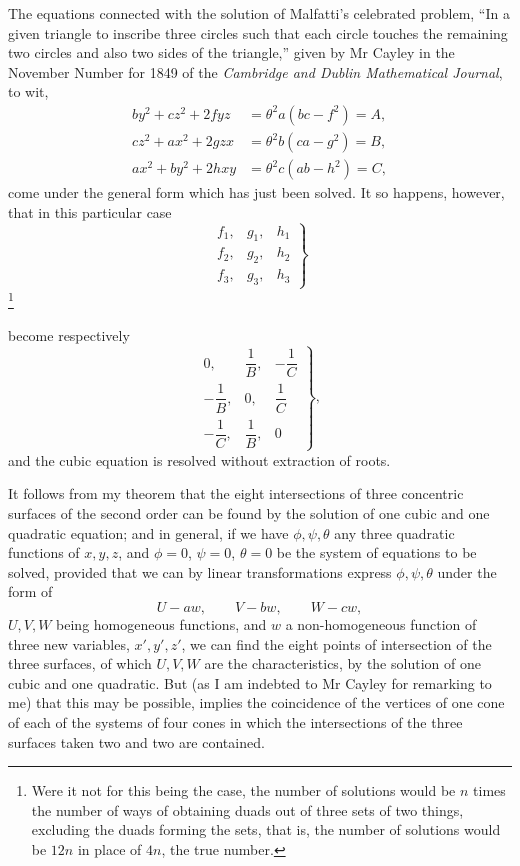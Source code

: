 \documentclass[11pt]{article}
\newcommand{\sourcepage}[1]{\marginpar{\scriptsize p.~#1}}
\begin{document}
{{The equations connected with the solution of Malfatti's celebrated problem, ``In a given triangle to inscribe three circles such that each circle touches the remaining two circles and also two sides of the triangle,'' given by Mr Cayley in the November Number for 1849 of the \emph{Cambridge and Dublin Mathematical Journal}, to wit,
\[
\begin{aligned}
 by^2+cz^2+2fyz&=\theta^2a(bc-f^2)=A,\\
 cz^2+ax^2+2gzx&=\theta^2b(ca-g^2)=B,\\
 ax^2+by^2+2hxy&=\theta^2c(ab-h^2)=C,
\end{aligned}
\]
come under the general form which has just been solved. It so happens, however, that in this particular case
\[
\left.
\begin{array}{ccc}
f_1,&g_1,&h_1\\
f_2,&g_2,&h_2\\
f_3,&g_3,&h_3
\end{array}
\right\}
\]
\footnote{Were it not for this being the case, the number of solutions would be $n$ times the number of ways of obtaining duads out of three sets of two things, excluding the duads forming the sets, that is, the number of solutions would be $12n$ in place of $4n$, the true number.}

\sourcepage{154}
become respectively
\[
\left.
\begin{array}{ccc}
0,&\dfrac1B,&-\dfrac1C\\[0.5em]
-\dfrac1B,&0,&\dfrac1C\\[0.5em]
-\dfrac1C,&\dfrac1B,&0
\end{array}
\right\},
\]
and the cubic equation is resolved without extraction of roots.

It follows from my theorem that the eight intersections of three concentric surfaces of the second order can be found by the solution of one cubic and one quadratic equation; and in general, if we have $\phi,\psi,\theta$ any three quadratic functions of $x,y,z$, and $\phi=0$, $\psi=0$, $\theta=0$ be the system of equations to be solved, provided that we can by linear transformations express $\phi,\psi,\theta$ under the form of
\[
 U-aw,\qquad V-bw,\qquad W-cw,
\]
$U,V,W$ being homogeneous functions, and $w$ a non-homogeneous function of three new variables, $x',y',z'$, we can find the eight points of intersection of the three surfaces, of which $U,V,W$ are the characteristics, by the solution of one cubic and one quadratic. But (as I am indebted to Mr Cayley for remarking to me) that this may be possible, implies the coincidence of the vertices of one cone of each of the systems of four cones in which the intersections of the three surfaces taken two and two are contained.

}}
\end{document}
